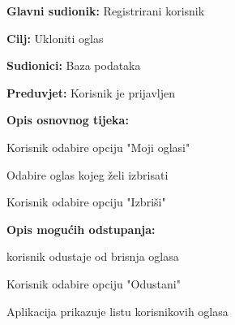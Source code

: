 \noindent {}
\begin{packed_item}
	
	\item \textbf{Glavni sudionik: }Registrirani korisnik
	\item  \textbf{Cilj:} Ukloniti oglas
	\item  \textbf{Sudionici:} Baza podataka
	\item  \textbf{Preduvjet:} Korisnik je prijavljen
	\item  \textbf{Opis osnovnog tijeka:}
	
	\item[] \begin{packed_enum}
		
		\item Korisnik odabire opciju "Moji oglasi"
		\item Odabire oglas kojeg želi izbrisati
		\item Korisnik odabire opciju "Izbriši"
	\end{packed_enum}
	
	\item  \textbf{Opis mogućih odstupanja:}
	
	\item[] \begin{packed_item}
		
		\item[3.a] korisnik odustaje od brisnja oglasa
		\item[] \begin{packed_enum}
			
			\item Korisnik odabire opciju "Odustani"
			\item Aplikacija prikazuje listu korisnikovih oglasa
			
		\end{packed_enum}
		
		
	\end{packed_item}
\end{packed_item}

